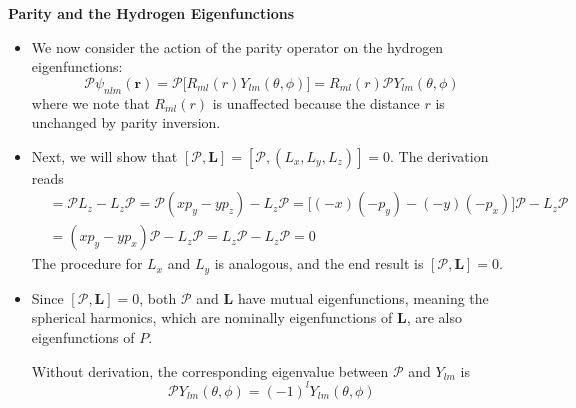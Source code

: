 \documentclass[11pt, a4paper]{article}
\renewcommand{\vec}[1]{\bm{#1}} %
\newcommand{\p}{\psi}  %
\renewcommand{\r}{\vec{r}}  %
\renewcommand{\P}{\mathcal{P}}  %
\begin{document}
\textbf{Parity and the Hydrogen Eigenfunctions}
\begin{itemize}
	\item We now consider the action of the parity operator on the hydrogen eigenfunctions:
	\begin{equation*}
		\P\p_{nlm}(\r) = \P\big[R_{ml}(r)Y_{lm}(\theta, \phi)\big] = R_{ml}(r) \P Y_{lm}(\theta, \phi)
	\end{equation*}
	where we note that $ R_{ml}(r) $ is unaffected because the distance $ r $ is unchanged by parity inversion.
	
	\item Next, we will show that $ [\P, \vec{L}] = [\P, (L_{x}, L_{y}, L_{z})] = 0 $. The derivation reads
	\begin{align*}
		[\P, L_{z}] &= \P L_{z} - L_{z}\P = \P(xp_{y} - yp_{z}) - L_{z}\P = \big[(-x)(-p_{y}) - (-y)(-p_{x})\big]\P - L_{z}\P\\
		& = (xp_{y} - yp_{x})\P - L_{z}\P = L_{z}\P - L_{z}\P = 0
	\end{align*}
	The procedure for  $ L_{x} $ and $ L_{y} $ is analogous, and the end result is $ [\P, \vec{L}] = 0 $. 
	
	\item Since $ [\P, \vec{L}] = 0 $, both $ \P $ and $ \vec{L} $ have mutual eigenfunctions, meaning the spherical harmonics, which are nominally eigenfunctions of $ \vec{L} $, are also eigenfunctions of $ P $. 
	
	Without derivation, the corresponding eigenvalue between $ \P $ and $ Y_{lm} $ is
	\begin{equation*}
		\P Y_{lm}(\theta, \phi) = (-1)^{l}Y_{lm}(\theta, \phi)
	\end{equation*}
\end{itemize}
\end{document}
